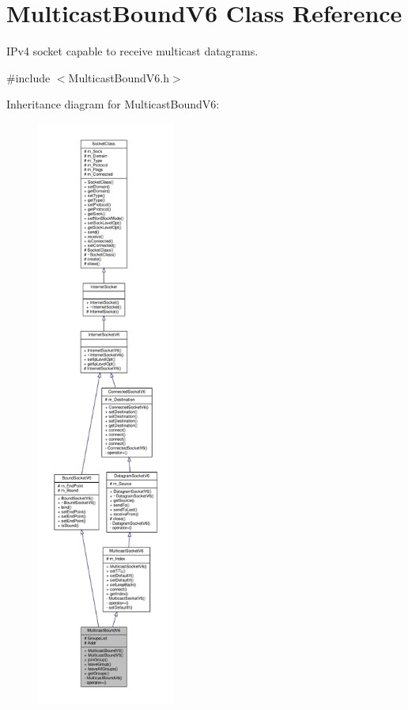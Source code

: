 \hypertarget{classMulticastBoundV6}{}\section{Multicast\+Bound\+V6 Class Reference}
\label{classMulticastBoundV6}


I\+Pv4 socket capable to receive multicast datagrams.  




{\ttfamily \#include $<$Multicast\+Bound\+V6.\+h$>$}



Inheritance diagram for Multicast\+Bound\+V6\+:\nopagebreak
\begin{figure}[H]
\begin{center}
\leavevmode
\includegraphics[height=550pt]{classMulticastBoundV6__inherit__graph}
\end{center}
\end{figure}
